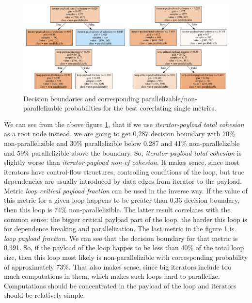 \begin{figure}[htb]
\centering
\includegraphics[width=\linewidth]{figs/decision-trees-single-metrics.png}
\caption{Decision boundaries and corresponding parallelizable/non-parallelizable probabilities for the best corerlating single metrics.}
\label{decision-trees-single-metrics}
\end{figure}\newline
\null\qquad We can see from the above figure \ref{decision-trees-single-metrics}, that if we use \textit{iterator-payload total cohesion} as a root node instead, we are going to get 0,287 decision boundary with 70\% non-parallelizible and 30\% parallelizible below 0,287 and 41\% non-parallelizible and 59\% parallelizible above the boundary. So, \textit{iterator-payload total cohesion} is slightly worse than \textit{iterator-payload non-cf cohesion}. It makes sence, since most iterators have control-flow structures, controlling conditions of the loop, but true dependencies are usually introduced by data edges from iterator to the payload. Metric \textit{loop critical payload fraction} can be used in the inverse way. If the value of this metric for a given loop happens to be greater than 0,33 decision boundary, then this loop is 74\% non-parallelizible. The latter result correlates with the common sense: the bigger critical payload part of the loop, the harder this loop is for dependence breaking and parallelization. The last metric in the figure \ref{decision-trees-single-metrics} is \textit{loop payload fraction}. We can see that the decision boundary for that metric is 0.391. So, if the payload of the loop happes to be less than 40\% of the total loop size, then this loop most likely is non-parallelizible with corresponding probability of approximately 73\%. That also makes sense, since big iterators include too much computations in them, which makes such loops hard to parallelize. Computations should be concentrated in the payload of the loop and iterators should be relatively simple.\newline
